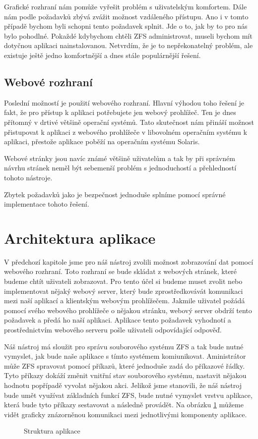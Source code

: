     Grafické rozhraní nám pomůže vyřešit problém s uživatelským komfortem. Dále nám podle požadavků zbývá zvážit možnost vzdáleného přístupu. Ano i v tomto případě bychom byli schopni tento požadavek splnit. Jde o to, jak by to pro nás bylo pohodlné. Pokaždé kdybychom chtěli ZFS administrovat, museli bychom mít dotyčnou aplikaci nainstalovanou. Netvrdím, že je to nepřekonatelný problém, ale existuje ještě jedno komfortnější a dnes stále populárnější řešení.
    \subsection{Webové rozhraní}
    Poslední možností je použití webového rozhraní. Hlavní výhodou toho řešení je fakt, že pro přístup k aplikaci potřebujete jen webový prohlížeč. Ten je dnes přítomný v drtivé většině operační systémů. Tato skutečnost nám přináší možnost přistupovat k aplikaci z webového prohlížeče v libovolném operačním systému k aplikaci, přestože aplikace poběží na operačním systému Solaris.

    Webové stránky jsou navíc známé většině uživatelům a tak by při správném návrhu stránek neměl být sebemenší problém s jednoduchostí a přehledností tohoto nástroje.

    Zbytek požadavků jako je bezpečnost jednoduše splníme pomocí správné implementace tohoto řešení.
\section{Architektura aplikace}
V předchozí kapitole jsme pro náš nástroj zvolili možnost zobrazování dat pomocí webového rozhraní. Toto rozhraní se bude skládat z webových stránek, které budeme chtít uživateli zobrazovat. Pro tento účel si budeme muset zvolit nebo implementovat nějaký webový server, který bude zprostředkovávát komunikaci mezi naší aplikací a klientským webovým prohlížečem. Jakmile uživatel požádá pomocí svého webového prohlížeče o nějakou stránku, webový server obdrží tento požadavek a předá ho naší aplikaci. Aplikace tento požadavek vyhodnotí a prostřednictvím webového serveru pošle uživateli odpovídající odpověď.

Náš nástroj má sloužit pro správu souborového systému ZFS a tak bude nutné vymyslet, jak bude naše aplikace s tímto systémem komiunikovat. Aministrátor může ZFS spravovat pomocí příkazů, které jednoduše zadá do příkazové řádky. Tyto příkazy dokáží změnit vnitřní stav souborového systému, nastavit nějakou hodnotu popřípadě vyvolat nějakou akci. Jelikož jsme stanovili, že náš nástroj bude umět využívat základních funkcí ZFS, bude nutné vymyslet vrstvu aplikace, která bude tyto příkazy sestavovat a následně provádět. Na obrázku \ref{architecture} můžeme vidět graficky znázorněnou komunikaci mezi jednotlivými komponenty aplikace.
\begin{figure}[h]
        \caption{Struktura aplikace}
        \label{architecture}
\end{figure}
